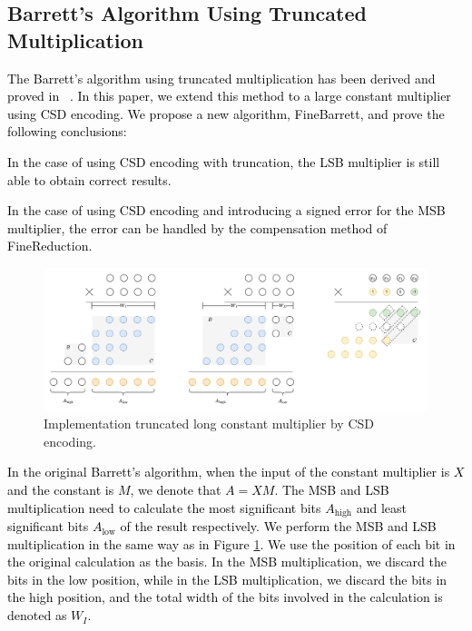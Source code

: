 \documentclass[conference]{IEEEtran}
\begin{document}
\subsection{Barrett's Algorithm Using Truncated Multiplication}%

\textcolor{black}{
The Barrett's algorithm using truncated multiplication has been derived and proved in  ~\cite{Efficient_FPGA_Modular_Multiplication_Implementation}. In this paper, we extend this method to a large constant multiplier using CSD encoding. We propose a new algorithm, FineBarrett, and prove the following conclusions:
}

\textcolor{black}{
In the case of using CSD encoding with truncation, the LSB multiplier is still able to obtain correct results.
}

\textcolor{black}{
In the case of using CSD encoding and introducing a signed error for the MSB multiplier, the error can be handled by the compensation method of FineReduction.
}

\begin{figure}[htbp]   %
	\centering
	\includegraphics[width=\linewidth,scale=1.00]{fig12.png}    %
	\caption{Implementation truncated long constant multiplier by CSD encoding.}
	\label{Figure11}
\end{figure}

\textcolor{black}{
In the original Barrett's algorithm, when the input of the constant multiplier is $X$ and the constant is $M$, we denote that $A=XM$. The MSB and LSB multiplication need to calculate the most significant bits $A_{\text{high}}$ and least significant bits $A_\text{low}$ of the result respectively. We perform the MSB and LSB multiplication in the same way as in Figure \ref{Figure11}. We use the position of each bit in the original calculation as the basis. In the MSB multiplication, we discard the bits in the low position, while in the LSB multiplication, we discard the bits in the high position, and the total width of the bits involved in the calculation is denoted as $W_I$.
}
\end{document}
